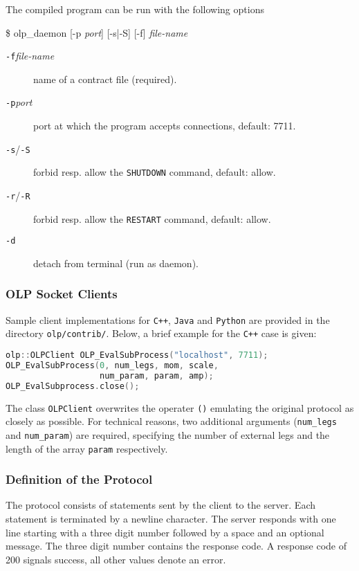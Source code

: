 \documentclass[11pt,a4paper]{refrep}
\newcommand{\python}{{\tt Python}\xspace}
\begin{document}
The compiled program can be run with the following options
\begin{example}
\$ olp\_daemon [-p \textit{port}] [-s|-S] [-f] \textit{file-name}
\end{example}
\begin{description}
\item[\texttt{-f}\textit{file-name}] name of a contract file (required).
\item[\texttt{-p}\textit{port}] port at which the program accepts connections,
   default: 7711.
\item[\texttt{-s}/\texttt{-S}] forbid resp. allow the
   \texttt{SHUTDOWN} command, default: allow.
\item[\texttt{-r}/\texttt{-R}] forbid resp. allow the
   \texttt{RESTART} command, default: allow.
\item[\texttt{-d}] detach from terminal (run as daemon).
\end{description}

\subsubsection{OLP Socket Clients}
Sample client implementations for \texttt{C++}, \texttt{Java} and
\python{} are provided in the directory \texttt{olp/contrib/}.
Below, a brief example for the \texttt{C++} case is given:
\begin{lstlisting}[language=C]
olp::OLPClient OLP_EvalSubProcess("localhost", 7711);
OLP_EvalSubProcess(0, num_legs, mom, scale,
                   num_param, param, amp);
OLP_EvalSubprocess.close();
\end{lstlisting}
The class \texttt{OLPClient} overwrites the operater \texttt{()}
emulating the original protocol as closely as possible. For technical
reasons, two additional arguments (\texttt{num\_legs} and \texttt{num\_param})
are required, specifying the number of external legs and the length of the
array \texttt{param} respectively.

\subsubsection{Definition of the Protocol}
The protocol consists of statements sent by the client to the server.
Each statement is terminated by a newline character. The server responds
with one line starting with a three digit number followed by a space
and an optional message. The three digit number contains the response code.
A response code of 200 signals success, all other values denote an error.
\end{document}
